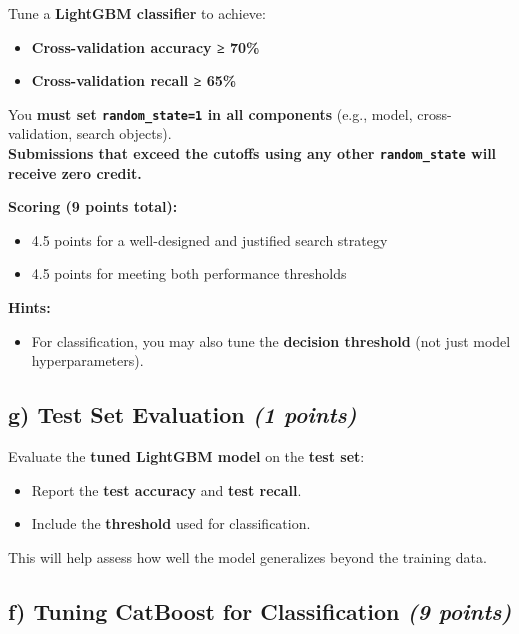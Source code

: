\documentclass[
  letterpaper,
  DIV=11,
  numbers=noendperiod]{scrreprt}
\providecommand{\tightlist}{%
  \setlength{\itemsep}{0pt}\setlength{\parskip}{0pt}}\usepackage{longtable,booktabs,array}
\begin{document}
Tune a \textbf{LightGBM classifier} to achieve:

\begin{itemize}
\tightlist
\item
  \textbf{Cross-validation accuracy ≥ 70\%}
\item
  \textbf{Cross-validation recall ≥ 65\%}
\end{itemize}

You \textbf{must set \texttt{random\_state=1} in all components} (e.g.,
model, cross-validation, search objects).\\
\textbf{Submissions that exceed the cutoffs using any other
\texttt{random\_state} will receive zero credit.}

\textbf{Scoring (9 points total):}

\begin{itemize}
\tightlist
\item
  4.5 points for a well-designed and justified search strategy\\
\item
  4.5 points for meeting both performance thresholds
\end{itemize}

\textbf{Hints:}

\begin{itemize}
\tightlist
\item
  For classification, you may also tune the \textbf{decision threshold}
  (not just model hyperparameters).
\end{itemize}

\subsection{\texorpdfstring{g) Test Set Evaluation \emph{(1
points)}}{g) Test Set Evaluation (1 points)}}\label{g-test-set-evaluation-1-points}

Evaluate the \textbf{tuned LightGBM model} on the \textbf{test set}:

\begin{itemize}
\tightlist
\item
  Report the \textbf{test accuracy} and \textbf{test recall}.
\item
  Include the \textbf{threshold} used for classification.
\end{itemize}

This will help assess how well the model generalizes beyond the training
data.

\subsection{\texorpdfstring{f) Tuning CatBoost for Classification
\emph{(9
points)}}{f) Tuning CatBoost for Classification (9 points)}}\label{f-tuning-catboost-for-classification-9-points}
\end{document}
